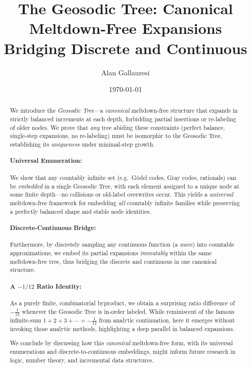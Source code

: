 \documentclass[11pt]{article}
\title{The Geosodic Tree: Canonical Meltdown-Free Expansions Bridging Discrete and Continuous}
\author{Alan Gallauresi}
\date{\today}
\theoremstyle{definition}
\theoremstyle{remark}
\begin{document}
\maketitle

\begin{abstract}
    We introduce the \emph{Geosodic Tree}---a \emph{canonical} meltdown-free structure
    that expands in strictly balanced increments at each depth, forbidding partial
    insertions or re-labeling of older nodes. We prove that \emph{any} tree abiding
    these constraints (perfect balance, single-step expansions, no re-labeling)
    must be isomorphic to the Geosodic Tree, establishing its \emph{uniqueness}
    under minimal-step growth.

    \paragraph{Universal Enumeration:}
    We show that any countably infinite set (e.g.\ G\"odel codes, Gray codes, rationals)
    can be \emph{embedded} in a single Geosodic Tree, with each element assigned to
    a unique node at some finite depth---no collisions or old-label overwrites occur.
    This yields a \emph{universal} meltdown-free framework for embedding \emph{all}
    countably infinite families while preserving a perfectly balanced shape
    and stable node identities.

    \paragraph{Discrete-Continuous Bridge:}
    Furthermore, by discretely sampling any continuous function (a \emph{wave}) into
    countable approximations, we embed its partial expansions \emph{immutably} within
    the same meltdown-free tree, thus bridging the discrete and continuous in one
    canonical structure.

    \paragraph{A $-1/12$ Ratio Identity:}
    As a purely finite, combinatorial byproduct, we obtain a surprising ratio difference
    of $-\tfrac{1}{12}$ whenever the Geosodic Tree is in-order labeled. While reminiscent
    of the famous infinite-sum $1+2+3+\cdots=-\tfrac{1}{12}$ from analytic continuation,
    here it emerges without invoking those analytic methods, highlighting a deep
    parallel in balanced expansions.

    We conclude by discussing how this \emph{canonical} meltdown-free form, with
    its universal enumerations and discrete-to-continuous embeddings, might inform
    future research in logic, number theory, and incremental data structures.
\end{abstract}
\end{document}
